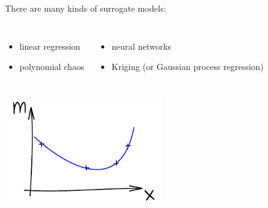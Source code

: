 \documentclass{beamer}
\begin{document}
\begin{frame}{}
There are many kinds of surrogate models:
\begin{columns}[t]
\column{4cm}
\begin{itemize}
	\item linear regression
	\item polynomial chaos
\end{itemize}
\column{6cm}
\begin{itemize}
	\item neural networks
	\item Kriging (or Gaussian process regression)
\end{itemize}
\end{columns}
\begin{center}
\includegraphics[height=4.5cm]{figures/ink_m}
\end{center}
\end{frame}
\end{document}
